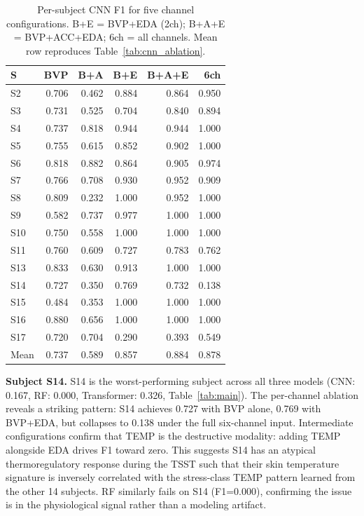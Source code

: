 \documentclass[10pt,twocolumn]{article}
\begin{document}
\begin{table}[t]
  \centering
  \caption{Per-subject CNN F1 for five channel configurations.
           B+E = BVP+EDA (2ch); B+A+E = BVP+ACC+EDA; 6ch = all channels.
           Mean row reproduces Table~\ref{tab:cnn_ablation}.}
  \label{tab:subject_ablation}
  \footnotesize
  \setlength{\tabcolsep}{4pt}
  \begin{tabular}{lrrrrr}
    \toprule
    S & BVP & B+A & B+E & B+A+E & 6ch \\
    \midrule
    S2  & 0.706 & 0.462 & 0.884 & 0.864 & 0.950 \\
    S3  & 0.731 & 0.525 & 0.704 & 0.840 & 0.894 \\
    S4  & 0.737 & 0.818 & 0.944 & 0.944 & 1.000 \\
    S5  & 0.755 & 0.615 & 0.852 & 0.902 & 1.000 \\
    S6  & 0.818 & 0.882 & 0.864 & 0.905 & 0.974 \\
    S7  & 0.766 & 0.708 & 0.930 & 0.952 & 0.909 \\
    S8  & 0.809 & 0.232 & 1.000 & 0.952 & 1.000 \\
    S9  & 0.582 & 0.737 & 0.977 & 1.000 & 1.000 \\
    S10 & 0.750 & 0.558 & 1.000 & 1.000 & 1.000 \\
    S11 & 0.760 & 0.609 & 0.727 & 0.783 & 0.762 \\
    S13 & 0.833 & 0.630 & 0.913 & 1.000 & 1.000 \\
    S14 & 0.727 & 0.350 & 0.769 & 0.732 & 0.138 \\
    S15 & 0.484 & 0.353 & 1.000 & 1.000 & 1.000 \\
    S16 & 0.880 & 0.656 & 1.000 & 1.000 & 1.000 \\
    S17 & 0.720 & 0.704 & 0.290 & 0.393 & 0.549 \\
    \midrule
    Mean & 0.737 & 0.589 & 0.857 & 0.884 & 0.878 \\
    \bottomrule
  \end{tabular}
\end{table}

\textbf{Subject S14.} S14 is the worst-performing subject across all
three models (CNN: 0.167, RF: 0.000, Transformer: 0.326,
Table~\ref{tab:main}). The per-channel ablation reveals a striking
pattern: S14 achieves 0.727 with BVP alone, 0.769 with BVP+EDA,
but collapses to 0.138 under the full six-channel input.
Intermediate configurations confirm that TEMP is the destructive modality:
adding TEMP alongside EDA drives F1 toward zero. This suggests S14 has
an atypical thermoregulatory response during the TSST such that their
skin temperature signature is inversely correlated with the stress-class
TEMP pattern learned from the other 14 subjects. RF similarly fails on
S14 (F1=0.000), confirming the issue is in the physiological signal
rather than a modeling artifact.
\end{document}
